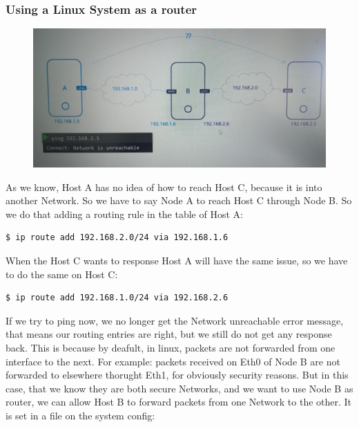 \documentclass{article}
\newenvironment{codetemplate}[1][]{%
  \mybasecolorbox[#1]
  \itshape
}{%
  \endmybasecolorbox
}
\begin{document}
\subsubsection{Using a Linux System as a router}

\begin{figure}[H]
    \includegraphics[width=\textwidth]{pictures/ntw6.png}
\end{figure}

As we know, Host A has no idea of how to reach Host C, because it is into another Network. So we have to say Node A to reach Host C through Node B. So we do that adding a routing rule in the table of Host A:

\begin{codetemplate}{}
\begin{verbatim}
$ ip route add 192.168.2.0/24 via 192.168.1.6
\end{verbatim}
\end{codetemplate}

When the Host C wants to response Host A will have the same issue, so we have to do the same on Host C:
\begin{codetemplate}{}
\begin{verbatim}
$ ip route add 192.168.1.0/24 via 192.168.2.6
\end{verbatim}
\end{codetemplate}

If we try to ping now, we no longer get the Network unreachable error message, that means our routing entries are right, but we still do not get any response back. This is because by deafult, in linux, packets are not forwarded from one interface to the next. For example: packets received on Eth0 of Node B are not forwarded to elsewhere thorught Eth1, for obviously security reasons. But in this case, that we know they are both secure Networks, and we want to use Node B as router, we can allow Host B to forward packets  from one Network to the other. It is set in a file on the system config:
\end{document}
